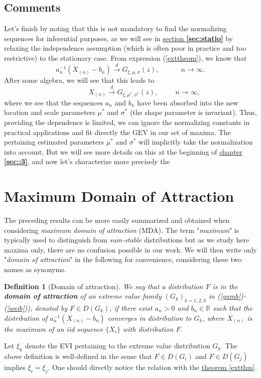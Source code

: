 \documentclass[11pt,a4paper,openany ]{book}
\newtheorem{definition}{Definition}[chapter]
\newcommand*{\QEDB}{\hfill\ensuremath{\triangle}}%
\begin{document}
\subsection*{Comments}
Let's finish by noting that this is not mandatory to find the normalizing sequences for inferential purposes, as we will see in \hyperref[sec:statio]{section \textbf{\ref{sec:statio}}} by relaxing the independence assumption (which is often poor in practice and too restrictive) to the stationary case. From expression (\ref{exttheom}), we know that
\begin{equation} \label{convseq1}
a_n^{-1}(X_{(n)}-b_n)\stackrel{d}{\longrightarrow} G_{\xi,\mu,\sigma}(z), \ \ \ \ \qquad \ n\rightarrow\infty.
\end{equation}
After some algebra, we will see that this leads to 
\begin{equation}\label{convseq2}
\qquad \quad \quad X_{(n)}\stackrel{d}{\longrightarrow} G_{\xi,\mu^*,\sigma^*}(z), \  \quad \quad \ n\rightarrow\infty,
\end{equation}
where we see that the sequences $a_n$ and $b_n$ have been absorbed into the new location and scale parameters $\mu^*$ and $\sigma^*$ (the shape parameter is invariant). Thus, providing the dependence is limited, we can ignore the normalizing constants in practical applications and fit directly the GEV in our set of maxima.
The pertaining estimated parameters $\mu^*$ and $\sigma^*$ will implicitly take the normalization into account. But we will see more details on this at the beginning of \hyperref[sec::3]{chapter \textbf{\ref{sec::3}}}, and now let's characterize more precisely the 

\section{Maximum Domain of Attraction}\label{sec:mda}

The preceding results can be more easily summarized and obtained when considering \emph{maximum domain of attraction} (MDA). The term "\emph{maximum}" is typically used to distinguish from \emph{sum-stable} distributions but as we study here maxima only, there are no confusion possible in our work. We will then write only "\emph{domain of attraction}" in the following for convenience, considering these two names as synonyms.

\begin{definition}[Domain of attraction] We say that a distribution $F$ is in the \emph{\textbf{domain of attraction}} of an extreme value family $(G_{k})_{k=1,2,3}$ in (\ref{gumb})-(\ref{weib})\big), denoted by $F\in D(G_k)$, if there exist $a_n>0$ and $b_n\in\mathbb{R}$ such that the distribution of $a_n^{-1}(X_{(n)}-b_n)$ converges in distribution to $G_k$, where $X_{(n)}$ is the maximum of an iid sequence $\{X_i\}$ with distribution $F$. %
\end{definition}
Let $\xi_k$ denote the EVI pertaining to the extreme value distribution $G_k$. The above definition is well-defined in the sense that $F\in D(G_i)$ and $F\in D(G_j)$ implies $\xi_i=\xi_j$. One should directly notice the relation with the \hyperref[extthm]{theorem \ref{extthm}}.
\end{document}
